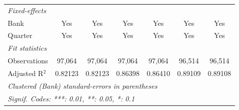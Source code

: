\begin{tabular}{lcccccc}
   \midrule
   \emph{Fixed-effects}\\
   Bank                           & Yes             & Yes             & Yes             & Yes             & Yes             & Yes\\  
   Quarter                        & Yes             & Yes             & Yes             & Yes             & Yes             & Yes\\  
   \midrule
   \emph{Fit statistics}\\
   Observations                   & 97,064          & 97,064          & 97,064          & 97,064          & 96,514          & 96,514\\  
   Adjusted R$^2$                 & 0.82123         & 0.82123         & 0.86398         & 0.86410         & 0.89109         & 0.89108\\  
   \midrule \midrule
   \multicolumn{7}{l}{\emph{Clustered (Bank) standard-errors in parentheses}}\\
   \multicolumn{7}{l}{\emph{Signif. Codes: ***: 0.01, **: 0.05, *: 0.1}}\\
\end{tabular}
\par\endgroup


